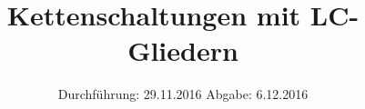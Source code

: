 


\subject{V356}
\title{Kettenschaltungen mit LC-Gliedern}
\date{
	Durchführung: 29.11.2016
	\hspace{4em}
	Abgabe: 6.12.2016
}


	\maketitle
	\newpage
	\tableofcontents
	\newpage
	
	
	
	
	
	\newpage
	
	\printbibliography


